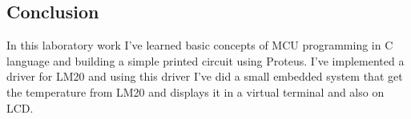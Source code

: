 \subsection*{Conclusion}
In this laboratory work I've learned basic concepts of MCU
programming in C language and building a simple printed circuit using Proteus. I've implemented a driver for LM20 and using this driver I've did a small embedded system that get the temperature from LM20 and displays it in a virtual terminal and also on LCD.



